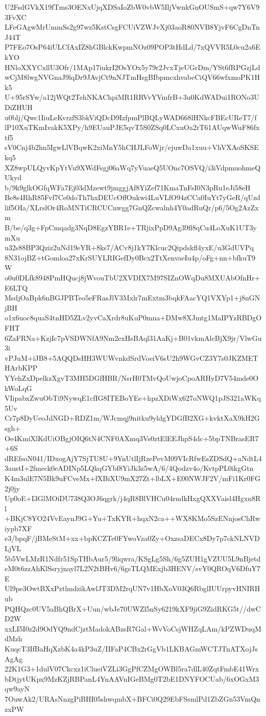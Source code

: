 U2FsdGVkX19fTms3OENxUjqXDSaIoZbW0vbW5IljVwnkGnOUSmS+qw7Y6V93FvXC
LFeGAgwMrUmmSs2g97wz5KstCsgFCUiVZWJvXj03aoR80NVB8YjvF6CgDnTnJ44T
P7FEo7OsP64iULCfAxIZ8hGBlckKwpmNOz09POP3tHdLd/7xQVVR5L0cu2a6EkYO
HNloXXYCxllU3Ofr/1MAp17iukrI2OsYOx5y79r2JvxTjeUGrDm/YSt6fRPGzjLd
wCjM8lwgNVGnaJ9lqDr9JAvjCt9nNJTmHsgBIbpmcxhvabeCiQV66wfxmoPK1Hk5
U+95rSYw/a12jWQt2TehNKAChpiMR1RRVvYVmfrB+3u0KdWADui1RONo3UDiZHUH
u0blj/Qwc1IiuLeKvrzfS3bkViQDcD9IzfpmPlBQLyWAD668lHNkcFBEcUReT7/f
lP10XuTKmIvakK5XPy/h9EUauPJE5qvT5S0ZSq0LCxuOa2rT61AUqwWuF86fxtf5
sV0Cnj4b2hn5IgwLlVBqwK2xiMnY5hCHJLFoWjr/ejuwDa1xuu+VhVXAoSKSEkq5
XZ8wpULQyvKpYtVu9XWdFsgj06aWq7yVuaeQ5UOnc7OSVQ/i3iVdpmuohmeQUkyd
b/9k9glkOGfqWFa7Ej03dMzewt9jmggjAf8YiZef71KmaTnFsI0N3pRu1eJi58eH
Be8s4RhR85Fvf7Ce0doTh7hxDEUcOffOukwi4LuVLfO94zCCa0IuYt7yGeR/qUzd
lif5OIa/XLrslOr4RoMNTiCRCUCnwgg7GnQZcwalnh4Y0adRuQr/p6/5Og2AzZxm
B/be/q3g+FpCmqadg3NqD8EgzYBR1e+TRjixPpD9Ag39fl8qCu4LoXuK1UT3ymXu
u32s88BP3Qziz2uNd19eYR+8ks7/ACv8j1kY7Klcuc2Qipdskfl4yxE/u3GdUVPq
8N31ojBZ+tGomloa27xKrSUYLRIGefDy0Bcx2TtXenvaeIu4p/oFg+nn+bfkuT9W
o0u0DLfk8948PmHQucj8jWvouTbU2XVDIX7M97SIZnOWqDu8MXUAbOfnHr+E6LTQ
MsdjOaBpk6nBGJPBTeo5eFRasJlV3Mxlr7mExtm3bqkFAacYQ1VXYp1+j8nGNjBH
o1x6uoc8quaS4tnHD5ZLv2yvCaXrdr8uKuP0mna+DMw8XJmtg1MaIPYzRBDgOFHT
6ZaFRNa+KzjIc7pVSDWNfA9Nm2exHsBAql31AaKj+B01vkmAlcBjX9jr/VlwGu3i
vPJuM+iJB8+5AQQDsHH3WUWvnkdSrdVoeiV6sU2h9WGvCZ3Y7s0JKZMETHArbKPP
YYehZxDpelkzXgvT3MH5DGfHBR/NsrH0TMvQoUwjoCpoARHyD7V54mde0OkWoLqG
VIipabxZwuObTi9NywqE1cfIG8ITEBoYEe+hpzXDiWx627oNWQ1pJS321aWKq5Uv
Cr7p8DyUeoJdNGD+RDZ1m/WJcmqj9nitku9yldgYDGfB2XG+kvktXaX9kH2Gsgh+
Oe4KmiXlKdUiOBgjOIQ6tN4CNF0AXmq3Vs0ztElEEJhpS4dc+5bpTNBrasER7+6S
dREfsoN041/IDxogAjY7SjTU8U+9YnUtlIjRzePevM09VIcRfwEsZDSdQ+aNdtL4
3austI+2fmeck0eADINp5LQkqGYbf8YiJk3z5wA/6/4Qodzv4o/KvtpPL0ikgGtn
K4m3ulE7N5Bk9uFCveMx+fXBiXU9mX27Zt+lbLX+E00NWJF2V/mFi1Kr0FG2j0jy
Up0oE+I3GlMOiDU738Q3OJ6qgrk/j4qR8BlVHCu04rndkHxgQXXVaisl4Hgxn8Rl
+BKjC8YO24VvEaynJ9G+Yu+TxKYR+hqxN2ca++WX8KMo5SzENnjosChRwiypb7XF
e3/bpqF/jBMeStM+xx+bpKCZTe0FYwoVza0Zy+OxzsaDECx8Dy7p7ckNLNVDLjVL
5b5VwLMzR1Ndfr51SpTHbAur5/9liqwra/KSgLg5Sh/6g5ZUH1gVZUU5L9nBjetd
eM0t6zzAhKlSsryjnayl7L2N2tBHv6/6gsTLQMExjb3HENV/svY0QROqV6DfuY7E
Ul9pe3OwtBXxPztlmdzikAwlJT3DM2rqUN7v1HbXoV03Q6RbglIUUrpyvHNIRHub
PQHQzc0UV5aBhQBrX+Uun/wbJe70UWZl5nSy6219kXF9jiG9ZidRKG5t//dwCD2W
xxLI5I0z2d9OdYQ9ndCjztMadokABzsR7Gal+WvVoCsjWHZqLAm/kPZWDuqMdMzh
KuqcT3IfBaHqXzbK4a4kP3uZ/IIFaP4CBx2rGgVb1LKBAGmWCTJTnATXojJsAgAg
22K1G3+1dulV07Ckcxz1iClueiVZLi3GgPfCZMgOWBl5ra7dlL40ZqtFmbE41Wrx
bDtjytUKpx9MzKZjRBPanL4YnAAVnIGeBMg0T2bE1DNYFOCUab/6xOGxM3qw9ayN
7OuwAk2/URAsNnzgPiBHI05shwqmbX+BFCi0Q29EbFSsmlPd1ZbZGn53VmQnzxPW
